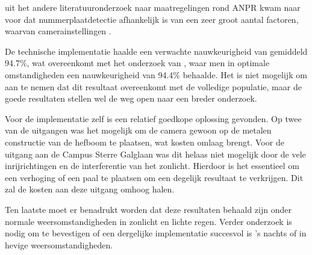 uit het andere literatuuronderzoek naar maatregelingen rond ANPR kwam  naar voor dat nummerplaatdetectie afhankelijk is van een zeer groot aantal factoren, waarvan camerainstellingen .

De technische implementatie haalde een verwachte nauwkeurigheid van gemiddeld 94.7\%, wat overeenkomt met het onderzoek van \textcite{figuerola2016automated}, waar men in optimale omstandigheden een nauwkeurigheid van 94.4\% behaalde. Het is niet mogelijk om aan te nemen dat dit resultaat overeenkomt met de volledige populatie, maar de goede resultaten stellen wel de weg open naar een breder onderzoek.

Voor de implementatie zelf is een relatief goedkope oplossing gevonden. Op twee van de uitgangen was het mogelijk om de camera gewoon op de metalen constructie van de hefboom te plaatsen, wat kosten omlaag brengt. Voor de uitgang aan de Campus Sterre Galglaan was dit helaas niet mogelijk door de vele inrijrichtingen en de interferentie van het zonlicht. Hierdoor is het essentieel om een verhoging of een paal te plaatsen om een degelijk resultaat te verkrijgen. Dit zal de kosten aan deze uitgang omhoog halen.

Ten laatste moet er benadrukt worden dat deze resultaten behaald zijn onder normale weersomstandigheden in zonlicht en lichte regen. Verder onderzoek is nodig om te bevestigen of een dergelijke implementatie succesvol is 's nachts of in hevige weersomstandigheden.